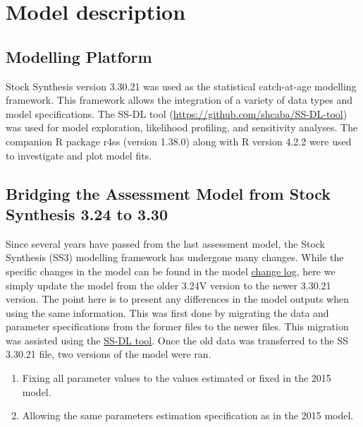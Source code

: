 \documentclass[11pt,
  letterpaper,
]{article}
\providecommand{\tightlist}{%
  \setlength{\itemsep}{0pt}\setlength{\parskip}{0pt}}
\providecommand{\tightlist}{%
  \setlength{\itemsep}{0pt}\setlength{\parskip}{0pt}}
\begin{document}
\hypertarget{model-description}{%
\section{Model description}\label{model-description}}

\hypertarget{modelling-platform}{%
\subsection{Modelling Platform}\label{modelling-platform}}

Stock Synthesis version 3.30.21 was used as the statistical catch-at-age modelling framework. This framework allows the integration of a variety of data types and model specifications. The SS-DL tool (\url{https://github.com/shcaba/SS-DL-tool}) was used for model exploration, likelihood profiling, and sensitivity analyses. The companion R package r4ss (version 1.38.0) along with R version 4.2.2 were used to investigate and plot model fits.

\hypertarget{bridging-the-assessment-model-from-stock-synthesis-3.24-to-3.30}{%
\subsection{Bridging the Assessment Model from Stock Synthesis 3.24 to 3.30}\label{bridging-the-assessment-model-from-stock-synthesis-3.24-to-3.30}}

Since several years have passed from the last assessment model, the Stock Synthesis (SS3) modelling framework has undergone many changes. While the specific changes in the model can be found in the model \href{https://github.com/nmfs-stock-synthesis/stock-synthesis/blob/v3.30.19/Change_log_for_SS_3.30.xlsx?raw=true}{change log}, here we simply update the model from the older 3.24V version to the newer 3.30.21 version. The point here is to present any differences in the model outputs when using the same information. This was first done by migrating the data and parameter specifications from the former files to the newer files. This migration was assisted using the \href{https://github.com/shcaba/SS-DL-tool}{SS-DL tool}. Once the old data was transferred to the SS 3.30.21 file, two versions of the model were ran.

\begin{enumerate}
\def\labelenumi{\arabic{enumi})}
\tightlist
\item
  Fixing all parameter values to the values estimated or fixed in the 2015 model.
\item
  Allowing the same parameters estimation specification as in the 2015 model.
\end{enumerate}
\end{document}

